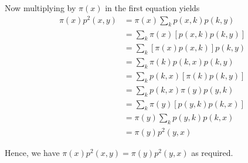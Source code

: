 \documentclass[12pt]{article}
\begin{document}
Now multiplying by $\pi(x)$ in the first equation yields
\begin{align*}
\pi(x) p^2(x, y) &= \pi(x) \sum_k p(x, k) p(k, y)\\
&= \sum_k \pi(x) \left[p(x, k) p(k, y)\right]\\
&= \sum_k \left[\pi(x) p(x, k)\right] p(k,y)\\
&= \sum_k \pi(k) p(k, x) p(k, y)\\
&= \sum_k p(k, x) \left[\pi(k) p(k, y)\right]\\
&= \sum_k p(k, x) \pi(y) p(y, k)\\
&= \sum_k \pi(y) \left[ p(y, k) p(k, x) \right]\\
&= \pi(y) \sum_k p(y, k) p(k, x)\\
&= \pi(y) p^2(y, x)
\end{align*}

Hence, we have $\pi(x) p^2(x, y) = \pi(y) p^2(y, x)$ as required.
\end{document}
